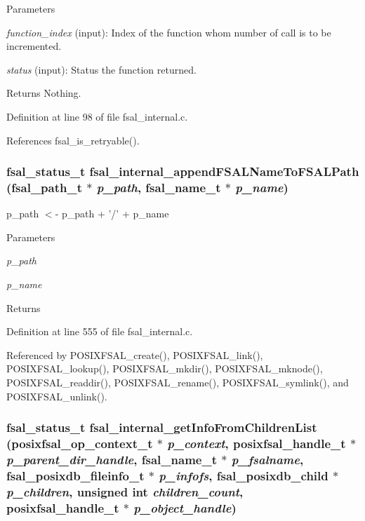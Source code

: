 \begin{DoxyParams}{Parameters}
\item[{\em function\_\-index}](input): Index of the function whom number of call is to be incremented. \item[{\em status}](input): Status the function returned.\end{DoxyParams}
\begin{DoxyReturn}{Returns}
Nothing. 
\end{DoxyReturn}


Definition at line 98 of file fsal\_\-internal.c.

References fsal\_\-is\_\-retryable().
\subsubsection[{fsal\_\-internal\_\-appendFSALNameToFSALPath}]{\setlength{\rightskip}{0pt plus 5cm}fsal\_\-status\_\-t fsal\_\-internal\_\-appendFSALNameToFSALPath (fsal\_\-path\_\-t $\ast$ {\em p\_\-path}, \/  fsal\_\-name\_\-t $\ast$ {\em p\_\-name})}\label{fsal__internal_8c_aacfc95a6de27ac00c3a1168440aaabdf}


p\_\-path $<$-\/ p\_\-path + '/' + p\_\-name 
\begin{DoxyParams}{Parameters}
\item[{\em p\_\-path}]\item[{\em p\_\-name}]\end{DoxyParams}
\begin{DoxyReturn}{Returns}

\end{DoxyReturn}


Definition at line 555 of file fsal\_\-internal.c.

Referenced by POSIXFSAL\_\-create(), POSIXFSAL\_\-link(), POSIXFSAL\_\-lookup(), POSIXFSAL\_\-mkdir(), POSIXFSAL\_\-mknode(), POSIXFSAL\_\-readdir(), POSIXFSAL\_\-rename(), POSIXFSAL\_\-symlink(), and POSIXFSAL\_\-unlink().
\subsubsection[{fsal\_\-internal\_\-getInfoFromChildrenList}]{\setlength{\rightskip}{0pt plus 5cm}fsal\_\-status\_\-t fsal\_\-internal\_\-getInfoFromChildrenList (posixfsal\_\-op\_\-context\_\-t $\ast$ {\em p\_\-context}, \/  posixfsal\_\-handle\_\-t $\ast$ {\em p\_\-parent\_\-dir\_\-handle}, \/  fsal\_\-name\_\-t $\ast$ {\em p\_\-fsalname}, \/  fsal\_\-posixdb\_\-fileinfo\_\-t $\ast$ {\em p\_\-infofs}, \/  fsal\_\-posixdb\_\-child $\ast$ {\em p\_\-children}, \/  unsigned int {\em children\_\-count}, \/  posixfsal\_\-handle\_\-t $\ast$ {\em p\_\-object\_\-handle})}\label{fsal__internal_8c_aea924ead81f70fd313405c06715d27cb}


